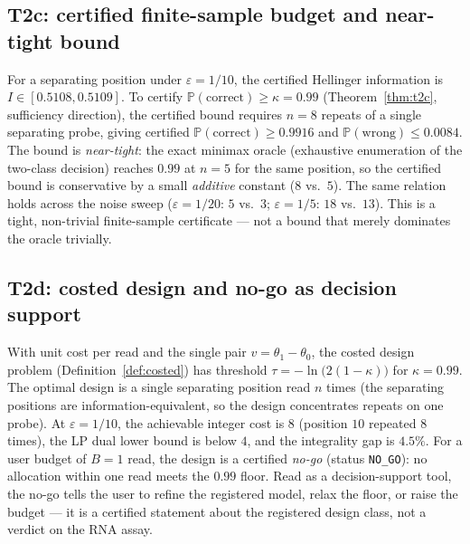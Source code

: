 \documentclass[11pt]{article}
\begin{document}
\subsection{T2c: certified finite-sample budget and near-tight bound}\label{sec:real-t2c}
For a separating position under $\varepsilon=1/10$, the certified Hellinger information is
$I\in[0.5108,0.5109]$. To certify
$\mathbb{P}(\mathrm{correct})\ge\kappa=0.99$ (Theorem~\ref{thm:t2c}, sufficiency direction), the
certified bound requires $n=8$ repeats of a single separating probe, giving certified
$\mathbb{P}(\mathrm{correct})\ge 0.9916$ and $\mathbb{P}(\mathrm{wrong})\le 0.0084$. The bound is
\emph{near-tight}: the exact minimax oracle (exhaustive enumeration of the two-class decision) reaches
$0.99$ at $n=5$ for the same position, so the certified bound is conservative by a small \emph{additive}
constant ($8$ vs.\ $5$). The same relation holds across the noise sweep
($\varepsilon=1/20$: $5$ vs.\ $3$; $\varepsilon=1/5$: $18$ vs.\ $13$). This is a tight, non-trivial
finite-sample certificate --- not a bound that merely dominates the oracle trivially.

\subsection{T2d: costed design and no-go as decision support}\label{sec:real-t2d}
With unit cost per read and the single pair $v=\theta_1-\theta_0$, the costed design problem
(Definition~\ref{def:costed}) has threshold $\tau=-\ln\!\bigl(2(1-\kappa)\bigr)$ for
$\kappa=0.99$. The optimal design is a single separating position read $n$ times (the separating
positions are information-equivalent, so the design concentrates repeats on one probe). At
$\varepsilon=1/10$, the achievable integer cost is $8$ (position $10$ repeated $8$ times), the LP dual
lower bound is below $4$, and the integrality gap is $4.5\%$. For a user budget of $B=1$ read, the
design is a certified \emph{no-go} (status \texttt{NO\_GO}): no allocation within one read meets the
$0.99$ floor. Read as a decision-support tool, the no-go tells the user to refine the registered model,
relax the floor, or raise the budget --- it is a certified statement about the registered design class,
not a verdict on the RNA assay.
\end{document}
